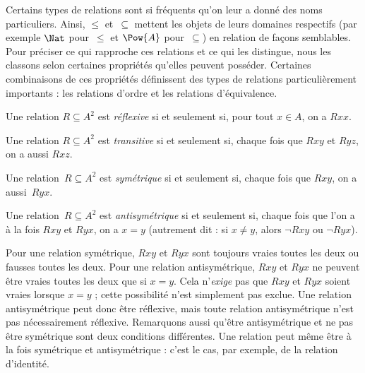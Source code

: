 \documentclass[../../../include/open-logic-section]{subfiles}
\begin{document}

\begin{intro}
Certains types de relations sont si fréquents qu’on leur a donné des noms
particuliers. Ainsi, $\le$ et~$\subseteq$ mettent les objets de leurs domaines
respectifs (par exemple $\Nat$ pour~$\le$ et $\Pow{A}$ pour~$\subseteq$)
en relation de façons semblables. Pour préciser ce qui rapproche ces
relations et ce qui les distingue, nous les classons selon certaines
propriétés qu’elles peuvent posséder. Certaines combinaisons de ces
propriétés définissent des types de relations particulièrement importants :
les relations d’ordre et les relations d’équivalence.
\end{intro}

\begin{defn}[Réflexivité]
Une relation $R \subseteq A^2$ est \emph{réflexive} si et seulement si,
pour tout $x \in A$, on a $Rxx$.
\end{defn}

\begin{defn}[Transitivité]
Une relation $R \subseteq A^2$ est \emph{transitive} si et seulement si,
chaque fois que $Rxy$ et $Ryz$, on a aussi $Rxz$.
\end{defn}

\begin{defn}[Symétrie]
Une relation~$R \subseteq A^2$ est \emph{symétrique} si et seulement si,
chaque fois que $Rxy$, on a aussi~$Ryx$.
\end{defn}

\begin{defn}[Antisymétrie]
Une relation~$R \subseteq A^2$ est \emph{antisymétrique} si et seulement si,
chaque fois que l’on a à la fois $Rxy$ et $Ryx$, on a $x=y$
(autrement dit : si $x\neq y$, alors $\lnot Rxy$ ou $\lnot Ryx$).
\end{defn}

\begin{explain}
Pour une relation symétrique, $Rxy$ et $Ryx$ sont toujours vraies toutes
les deux ou fausses toutes les deux. Pour une relation antisymétrique,
$Rxy$ et $Ryx$ ne peuvent être vraies toutes les deux que si $x = y$.
Cela n’\emph{exige} pas que $Rxy$ et $Ryx$ soient vraies lorsque $x = y$ ;
cette possibilité n’est simplement pas exclue. Une relation antisymétrique
peut donc être réflexive, mais toute relation antisymétrique n’est pas
nécessairement réflexive. Remarquons aussi qu’être antisymétrique et ne pas
être symétrique sont deux conditions différentes. Une relation peut même
être à la fois symétrique et antisymétrique : c’est le cas, par exemple,
de la relation d’identité.
\end{explain}
\end{document}
